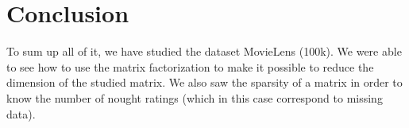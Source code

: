 \documentclass{article}
\begin{document}
\section*{Conclusion}
To sum up all of it, we have studied the dataset MovieLens (100k).
We were able to see how to use the matrix factorization to make it possible to reduce the dimension of the studied matrix.
We also saw the sparsity of a matrix in order to know the number of nought ratings (which in this case correspond to missing data).


\nocite{*}
\printbibliography
\end{document}
